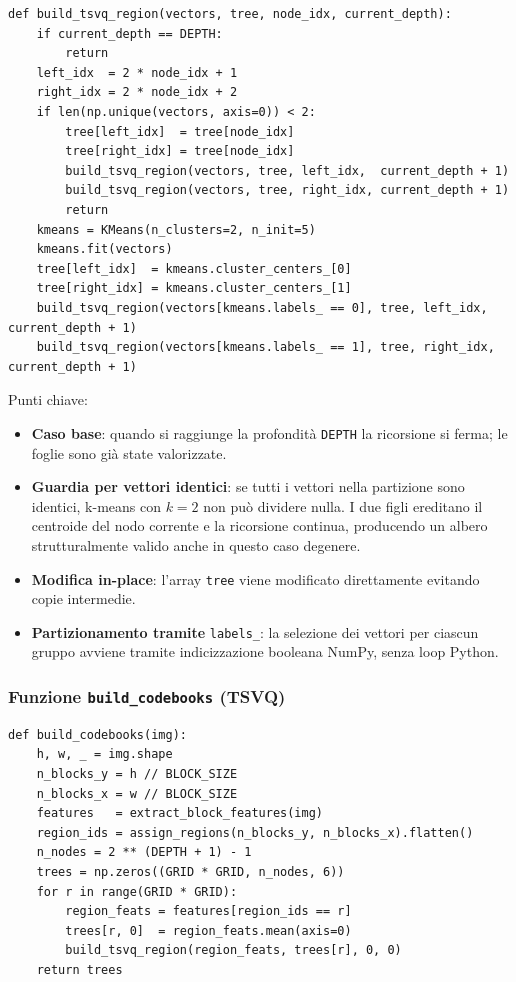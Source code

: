 \documentclass[12pt, a4paper]{article}
\begin{document}
\begin{lstlisting}[caption={Funzione ricorsiva \texttt{build\_tsvq\_region}}]
def build_tsvq_region(vectors, tree, node_idx, current_depth):
    if current_depth == DEPTH:
        return
    left_idx  = 2 * node_idx + 1
    right_idx = 2 * node_idx + 2
    if len(np.unique(vectors, axis=0)) < 2:
        tree[left_idx]  = tree[node_idx]
        tree[right_idx] = tree[node_idx]
        build_tsvq_region(vectors, tree, left_idx,  current_depth + 1)
        build_tsvq_region(vectors, tree, right_idx, current_depth + 1)
        return
    kmeans = KMeans(n_clusters=2, n_init=5)
    kmeans.fit(vectors)
    tree[left_idx]  = kmeans.cluster_centers_[0]
    tree[right_idx] = kmeans.cluster_centers_[1]
    build_tsvq_region(vectors[kmeans.labels_ == 0], tree, left_idx,  current_depth + 1)
    build_tsvq_region(vectors[kmeans.labels_ == 1], tree, right_idx, current_depth + 1)
\end{lstlisting}

Punti chiave:
\begin{itemize}
    \item \textbf{Caso base}: quando si raggiunge la profondità \texttt{DEPTH} la ricorsione
          si ferma; le foglie sono già state valorizzate.
    \item \textbf{Guardia per vettori identici}: se tutti i vettori nella partizione sono
          identici, k-means con $k=2$ non può dividere nulla. I due figli ereditano il
          centroide del nodo corrente e la ricorsione continua, producendo un albero
          strutturalmente valido anche in questo caso degenere.
    \item \textbf{Modifica in-place}: l'array \texttt{tree} viene modificato direttamente
          evitando copie intermedie.
    \item \textbf{Partizionamento tramite} \texttt{labels\_}: la selezione dei vettori per
          ciascun gruppo avviene tramite indicizzazione booleana NumPy, senza loop Python.
\end{itemize}

\subsubsection{Funzione \texttt{build\_codebooks} (TSVQ)}

\begin{lstlisting}[caption={Funzione \texttt{build\_codebooks} modificata per TSVQ}]
def build_codebooks(img):
    h, w, _ = img.shape
    n_blocks_y = h // BLOCK_SIZE
    n_blocks_x = w // BLOCK_SIZE
    features   = extract_block_features(img)
    region_ids = assign_regions(n_blocks_y, n_blocks_x).flatten()
    n_nodes = 2 ** (DEPTH + 1) - 1
    trees = np.zeros((GRID * GRID, n_nodes, 6))
    for r in range(GRID * GRID):
        region_feats = features[region_ids == r]
        trees[r, 0]  = region_feats.mean(axis=0)
        build_tsvq_region(region_feats, trees[r], 0, 0)
    return trees
\end{lstlisting}
\end{document}

